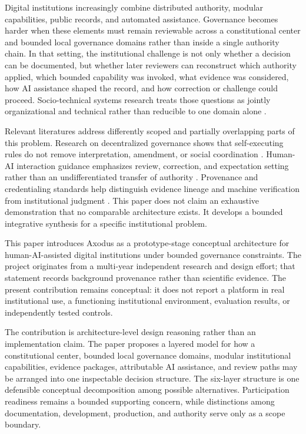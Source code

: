 \documentclass[11pt]{article}
\begin{document}
\begin{landscape}
Digital institutions increasingly combine distributed authority, modular
capabilities, public records, and automated assistance. Governance becomes
harder when these elements must remain reviewable across a constitutional
center and bounded local governance domains rather than inside a single
authority chain. In that setting, the institutional challenge is not only
whether a decision can be documented, but whether later reviewers can
reconstruct which authority applied, which bounded capability was invoked,
what evidence was considered, how AI assistance shaped the record, and how
correction or challenge could proceed. Socio-technical systems
research treats those questions as jointly organizational and technical rather
than reducible to one domain alone \citep{baxter2011sociotechnical}.

Relevant literatures address differently scoped and partially overlapping
parts of this problem. Research on decentralized governance shows
that self-executing rules do not remove interpretation, amendment, or social
coordination \citep{hassan2021dao,hsieh2018bitcoin}. Human-AI interaction
guidance emphasizes review, correction, and expectation setting rather than an
undifferentiated transfer of authority \citep{amershi2019guidelines}.
Provenance and credentialing standards help distinguish evidence lineage and
machine verification from institutional judgment
\citep{w3c2013provdm,w3c2025vcdm}. This paper does not claim an exhaustive
demonstration that no comparable architecture exists. It develops a bounded
integrative synthesis for a specific institutional problem.

This paper introduces Axodus as a prototype-stage conceptual architecture for
human-AI-assisted digital institutions under bounded governance constraints.
The project originates from a multi-year independent research and design
effort; that statement records background provenance rather than scientific
evidence. The present contribution remains conceptual: it does not report a
platform in real institutional use, a functioning institutional environment,
evaluation results, or independently tested controls.

The contribution is architecture-level design reasoning rather than an
implementation claim. The paper proposes a layered model for how a
constitutional center, bounded local governance domains, modular
institutional capabilities, evidence packages, attributable AI assistance,
and review paths may be arranged into one inspectable decision structure. The
six-layer structure is one defensible conceptual decomposition among possible
alternatives. Participation readiness remains a bounded supporting concern,
while distinctions among documentation, development, production, and
authority serve only as a scope boundary.


\end{landscape}
\end{document}

